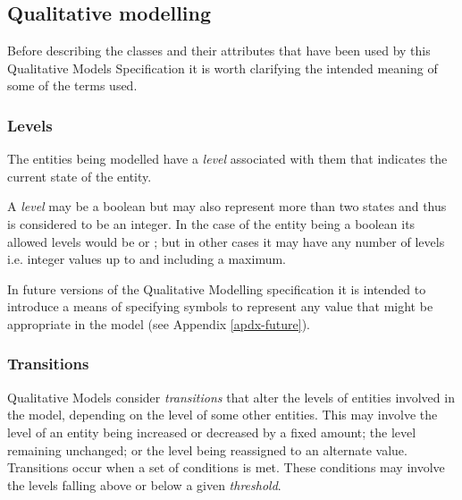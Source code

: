 \pagebreak
\subsection{Qualitative modelling}
\label{qual}

Before describing the classes and their attributes that have been used by this Qualitative Models Specification it is worth clarifying the intended meaning of some of the terms used. 

\subsubsection{Levels}


The entities being modelled have a \emph{level} associated with them that indicates the current state of the entity. 

A \emph{level} may be a boolean but may also represent more than two states and thus is considered to be an integer. In the case of the entity being a boolean its allowed levels would be  or ; but in other cases it may have any number of levels i.e. integer values up to and including a maximum. 

In future versions of the Qualitative Modelling specification it is intended to introduce a means of specifying symbols to represent any value that might be appropriate in the model (see Appendix \ref{apdx-future}).

\smallskip

\subsubsection{Transitions}

Qualitative Models consider \emph{transitions} that alter the levels of entities involved in the model, depending on the level of some other entities.  This may involve the level of an entity being increased or decreased by a fixed amount; the level remaining unchanged; or the level being reassigned to an alternate value. Transitions occur when a set of conditions is met. These conditions may involve the levels falling above or below  a given \emph{threshold}. 

